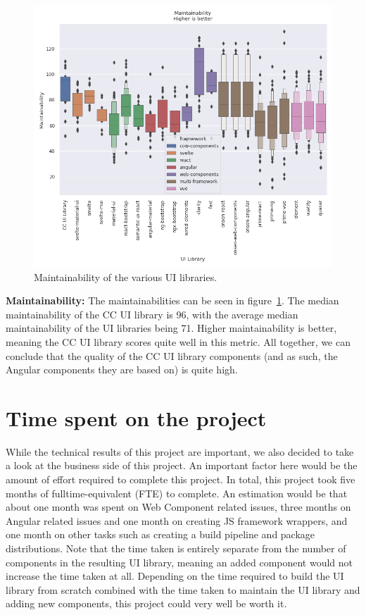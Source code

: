 \begin{figure}[htbp]
  \includegraphics[width=\columnwidth]{plots/maintainability.png}
  \caption{Maintainability of the various UI libraries.}
  \label{fig:results:maintainabilty}
  \centering
\end{figure}

\textbf{Maintainability:} The maintainabilities can be seen in figure~\ref{fig:results:maintainabilty}. The median maintainability of the CC UI library is 96, with the average median maintainability of the UI libraries being 71. Higher maintainability is better, meaning the CC UI library scores quite well in this metric. All together, we can conclude that the quality of the CC UI library components (and as such, the Angular components they are based on) is quite high.

\section{Time spent on the project}\label{sec:results:time-spent}
While the technical results of this project are important, we also decided to take a look at the business side of this project. An important factor here would be the amount of effort required to complete this project. In total, this project took five months of fulltime-equivalent (FTE) to complete. An estimation would be that about one month was spent on Web Component related issues, three months on Angular related issues and one month on creating JS framework wrappers, and one month on other tasks such as creating a build pipeline and package distributions. Note that the time taken is entirely separate from the number of components in the resulting UI library, meaning an added component would not increase the time taken at all. Depending on the time required to build the UI library from scratch combined with the time taken to maintain the UI library and adding new components, this project could very well be worth it.
